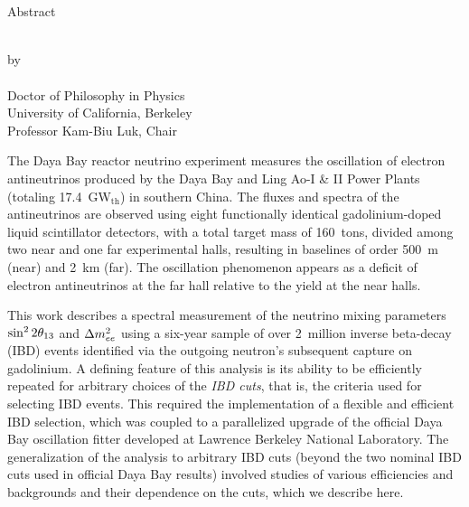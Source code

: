 \chapter*[Abstract]{}

\begin{center}
  Abstract

  \vspace{1.5\baselineskip}
  \MyTitle\\
  \vspace{\baselineskip} by\\
  \vspace{\baselineskip} \MyAuthor\\
  Doctor of Philosophy in Physics\\
  University of California, Berkeley\\
  Professor Kam-Biu Luk, Chair
  \vspace{\baselineskip}
\end{center}

\noindent
%
The Daya Bay reactor neutrino experiment measures the oscillation of electron antineutrinos produced by the Daya Bay and Ling Ao-I \& II Power Plants (totaling 17.4~GW$_\mathrm{th}$) in southern China. The fluxes and spectra of the antineutrinos are observed using eight functionally identical gadolinium-doped liquid scintillator detectors, with a total target mass of 160~tons, divided among two near and one far experimental halls, resulting in baselines of order 500~m (near) and 2~km (far). The oscillation phenomenon appears as a deficit of electron antineutrinos at the far hall relative to the yield at the near halls.

This work describes a spectral measurement of the neutrino mixing parameters $\sin^2 2\theta_{13}$ and $\Delta m^2_{ee}$ using a six-year sample of over 2~million inverse beta-decay (IBD) events identified via the outgoing neutron's subsequent capture on gadolinium. A defining feature of this analysis is its ability to be efficiently repeated for arbitrary choices of the \emph{IBD cuts}, that is, the criteria used for selecting IBD events. This required the implementation of a flexible and efficient IBD selection, which was coupled to a parallelized upgrade of the official Daya Bay oscillation fitter developed at Lawrence Berkeley National Laboratory. The generalization of the analysis to arbitrary IBD cuts (beyond the two nominal IBD cuts used in official Daya Bay results) involved studies of various efficiencies and backgrounds and their dependence on the cuts, which we describe here.

